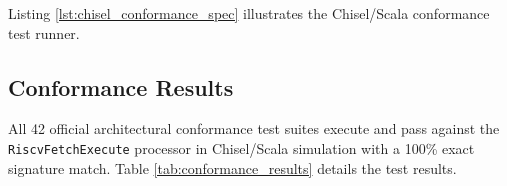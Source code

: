 Listing \ref{lst:chisel_conformance_spec} illustrates the Chisel/Scala conformance test runner.


\subsection{Conformance Results}

All 42 official architectural conformance test suites execute and pass against the \texttt{RiscvFetchExecute} processor in Chisel/Scala simulation with a 100\% exact signature match. Table \ref{tab:conformance_results} details the test results.

